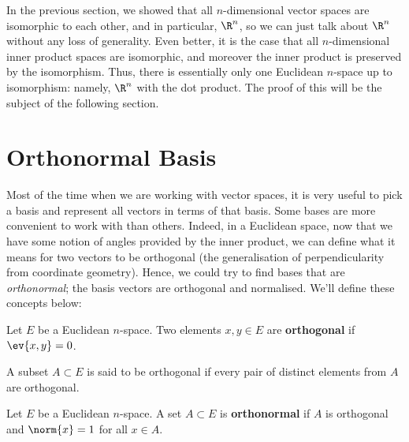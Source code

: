 In the previous section, we showed that all \( n \)-dimensional vector spaces are isomorphic to each other, and in particular, \( \R^n \), so we can just talk about \( \R^n \) without any loss of generality. Even better, it is the case that all \( n \)-dimensional inner product spaces are isomorphic, and moreover the inner product is preserved by the isomorphism. Thus, there is essentially only one Euclidean \( n \)-space up to isomorphism: namely, \( \R^n \) with the dot product. The proof of this will be the subject of the following section.

\section{Orthonormal Basis}
Most of the time when we are working with vector spaces, it is very useful to pick a basis and represent all vectors in terms of that basis. Some bases are more convenient to work with than others. Indeed, in a Euclidean space, now that we have some notion of angles provided by the inner product, we can define what it means for two vectors to be orthogonal (the generalisation of perpendicularity from coordinate geometry). Hence, we could try to find bases that are \emph{orthonormal}; the basis vectors are orthogonal and normalised. We'll define these concepts below:
\begin{definition}
  Let \( E \) be a Euclidean \( n \)-space. Two elements \( x,y\in E \) are \textbf{orthogonal} if \( \ev{x,y}=0 \).

  \vspace{3mm}
  
  A subset \( A\subset E \) is said to be orthogonal if every pair of distinct elements from \( A \) are orthogonal.
\end{definition}

\begin{definition}
  Let \( E \) be a Euclidean \( n \)-space. A set \( A\subset E \) is \textbf{orthonormal} if \( A \) is orthogonal and \( \norm{x}=1 \) for all \( x\in A \).
\end{definition}

